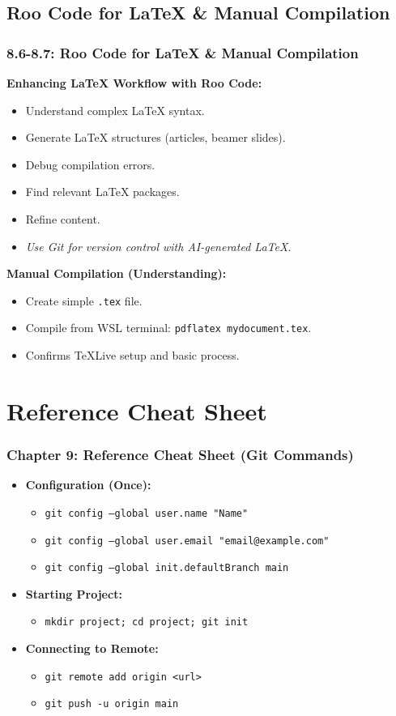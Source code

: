 \documentclass{beamer}
\begin{document}
\subsection{Roo Code for LaTeX \& Manual Compilation}
\begin{frame}
  \frametitle{8.6-8.7: Roo Code for LaTeX \& Manual Compilation}
  \textbf{Enhancing LaTeX Workflow with Roo Code:}
  \begin{itemize}
    \item Understand complex LaTeX syntax.
    \item Generate LaTeX structures (articles, beamer slides).
    \item Debug compilation errors.
    \item Find relevant LaTeX packages.
    \item Refine content.
    \item \textit{Use Git for version control with AI-generated LaTeX.}
  \end{itemize}
  \pause
  \textbf{Manual Compilation (Understanding):}
  \begin{itemize}
    \item Create simple \texttt{.tex} file.
    \item Compile from WSL terminal: \texttt{pdflatex mydocument.tex}.
    \item Confirms TeXLive setup and basic process.
  \end{itemize}
\end{frame}

\section{Reference Cheat Sheet}
\begin{frame}[fragile]
  \frametitle{Chapter 9: Reference Cheat Sheet (Git Commands)}
  \begin{itemize}
    \item \textbf{Configuration (Once):}
    \begin{itemize}
        \item \texttt{git config --global user.name "Name"}
        \item \texttt{git config --global user.email "email@example.com"}
        \item \texttt{git config --global init.defaultBranch main}
    \end{itemize}
    \pause
    \item \textbf{Starting Project:}
    \begin{itemize}
        \item \texttt{mkdir project; cd project; git init}
    \end{itemize}
    \pause
    \item \textbf{Connecting to Remote:}
    \begin{itemize}
        \item \texttt{git remote add origin <url>}
        \item \texttt{git push -u origin main}
    \end{itemize}
  \end{itemize}
\end{frame}
\end{document}
